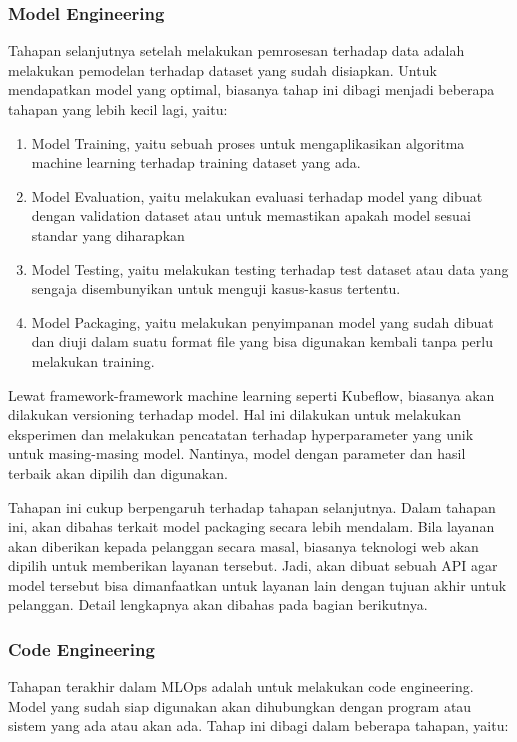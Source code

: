 \subsubsection{Model Engineering}

Tahapan selanjutnya setelah melakukan pemrosesan terhadap data adalah melakukan pemodelan terhadap dataset yang sudah disiapkan.
Untuk mendapatkan model yang optimal, biasanya tahap ini dibagi menjadi beberapa tahapan yang lebih kecil lagi, yaitu:
\begin{enumerate}
  \item Model Training, yaitu sebuah proses untuk mengaplikasikan algoritma machine learning terhadap training dataset yang ada.
  \item Model Evaluation, yaitu melakukan evaluasi terhadap model yang dibuat dengan validation dataset atau untuk memastikan apakah model sesuai standar yang diharapkan
  \item Model Testing, yaitu melakukan testing terhadap test dataset atau data yang sengaja disembunyikan untuk menguji kasus-kasus tertentu.
  \item Model Packaging, yaitu melakukan penyimpanan model yang sudah dibuat dan diuji dalam suatu format file yang bisa digunakan kembali tanpa perlu melakukan training.
\end{enumerate}

Lewat framework-framework machine learning seperti Kubeflow, biasanya akan dilakukan versioning terhadap model.
Hal ini dilakukan untuk melakukan eksperimen dan melakukan pencatatan terhadap hyperparameter yang unik untuk masing-masing model.
Nantinya, model dengan parameter dan hasil terbaik akan dipilih dan digunakan.

Tahapan ini cukup berpengaruh terhadap tahapan selanjutnya.
Dalam tahapan ini, akan dibahas terkait model packaging secara lebih mendalam.
Bila layanan akan diberikan kepada pelanggan secara masal, biasanya teknologi web akan dipilih untuk memberikan layanan tersebut.
Jadi, akan dibuat sebuah API agar model tersebut bisa dimanfaatkan untuk layanan lain dengan tujuan akhir untuk pelanggan. Detail lengkapnya akan dibahas pada bagian berikutnya. 

\subsubsection{Code Engineering}

Tahapan terakhir dalam MLOps adalah untuk melakukan code engineering.
Model yang sudah siap digunakan akan dihubungkan dengan program atau sistem yang ada atau akan ada.
Tahap ini dibagi dalam beberapa tahapan, yaitu:

